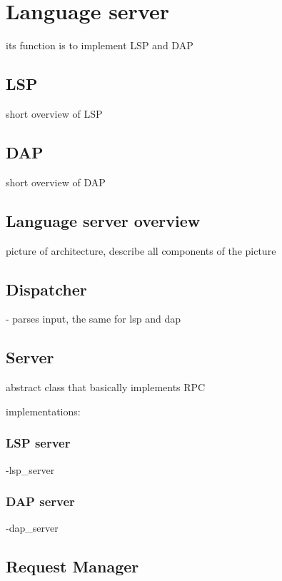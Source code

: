 \chapter{Language server}
\label{chap:lang_server}
its function is to implement LSP and DAP

\section{LSP}
short overview of LSP
\section{DAP}
short overview of DAP
\section{Language server overview}
picture of architecture, describe all components of the picture


\section{Dispatcher}
- parses input, the same for lsp and dap

\section{Server}
abstract class that basically implements RPC

implementations: 
\subsection{LSP server}
-lsp\_server
\subsection{DAP server}
-dap\_server
\section{Request Manager}


